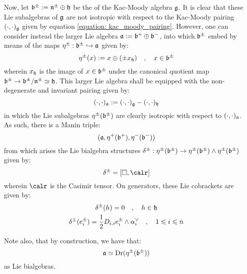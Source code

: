         Now, let $\mathfrak{b}^{\pm} := \mathfrak{n}^{\pm} \oplus \mathfrak{h}$ be the  of the Kac-Moody algebra $\mathfrak{g}$. It is clear that these Lie subalgebras of $\mathfrak{g}$ are not isotropic with respect to the Kac-Moody pairing $(\cdot, \cdot)_{\mathfrak{g}}$ given by equation \eqref{equation: kac_moody_pairing}. However, one can consider instead the larger Lie algebra $\mathfrak{a} := \mathfrak{b}^+ \oplus \mathfrak{b}^-$, into which $\mathfrak{b}^{\pm}$ embed by means of the maps $\eta^{\pm}: \mathfrak{b}^{\pm} \hookrightarrow \mathfrak{a}$ given by:
            \begin{equation} \label{equation: borel_lie_sub_bialgebra_embeddings}
                \eta^{\pm}(x) := x \oplus ( \pm x_{\mathfrak{h}} ) \quad, \quad x \in \mathfrak{b}^{\pm}
            \end{equation}
        wherein $x_{\mathfrak{h}}$ is the image of $x \in \mathfrak{b}^{\pm}$ under the canonical quotient map $\mathfrak{b}^{\pm} \to \mathfrak{b}^{\pm}/\mathfrak{n}^{\pm} \simeq \mathfrak{h}$. This larger Lie algebra shall be equipped with the non-degenerate and invariant pairing given by:
            $$(\cdot, \cdot)_{\mathfrak{a}} := (\cdot, \cdot)_{\mathfrak{g}} - (\cdot, \cdot)_{\mathfrak{h}}$$
        in which the Lie subalgebras $\eta^{\pm}(\mathfrak{b}^{\pm})$ are clearly isotropic with respect to $(\cdot, \cdot)_{\mathfrak{a}}$. As such, there is a Manin triple:
            $$(\mathfrak{a}, \eta^+(\mathfrak{b}^+), \eta^-(\mathfrak{b}^-))$$
        from which arises the Lie bialgebra structures $\delta^{\pm}: \eta^{\pm}(\mathfrak{b}^{\pm}) \to \eta^{\pm}(\mathfrak{b}^{\pm}) \wedge \eta^{\pm}(\mathfrak{b}^{\pm})$ given by:
            $$\delta^{\pm} = [\Box, \calr]$$
        wherein $\calr$ is the Casimir tensor. On generators, these Lie cobrackets are given by:
            \begin{equation} \label{equation: standard_kac_moody_lie_bialgebra_structure}
                \begin{gathered}
                    \delta^{\pm}(h) = 0 \quad, \quad h \in \mathfrak{h}
                    \\
                    \delta^{\pm}(e_i^{\pm}) = \frac12 D_{i, i} e_i^{\pm} \wedge \alpha_i^{\vee} \quad, \quad 1 \leqslant i \leqslant n
                \end{gathered}
            \end{equation}
        \begin{remark}
            Note also, that by construction, we have that:
                $$\mathfrak{a} \simeq \operatorname{Dr}( \eta^{\pm}( \mathfrak{b}^{\pm} ) )$$
            as Lie bialgebras.
        \end{remark}
            
